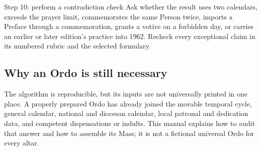 \begin{massbox}{Step 10: perform a contradiction check}
Ask whether the result uses two calendars, exceeds the prayer limit, commemorates the same Person twice, imports a Preface through a commemoration, grants a votive on a forbidden day, or carries an earlier or later edition's practice into 1962. Recheck every exceptional claim in its numbered rubric and the selected formulary.
\end{massbox}

\subsection{Why an Ordo is still necessary}

The algorithm is reproducible, but its inputs are not universally printed in one place. A properly prepared Ordo has already joined the movable temporal cycle, general calendar, national and diocesan calendar, local patronal and dedication data, and competent dispensations or indults. This manual explains how to audit that answer and how to assemble its Mass; it is not a fictional universal Ordo for every altar.
